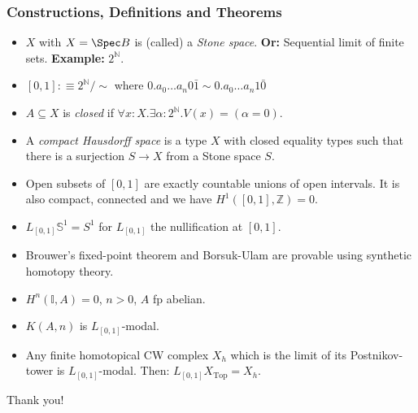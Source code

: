 \documentclass{beamer}
\begin{document}
\begin{frame}
  \frametitle{Constructions, Definitions and Theorems}
  \begin{itemize}
  \item $X$ with $X=\Spec B$ is (called) a \emph{Stone space}. \pause \textbf{Or:} Sequential limit of finite sets. \pause \textbf{Example:} $2^{\mathbb N}$.
    \pause
  \item $ [0,1] :\equiv 2^{\mathbb N}/\sim $ \pause \quad where $0.a_0\dots a_n0\bar{1}\sim 0.a_0\dots a_n1\bar{0}$
    \pause
  \item $A\subseteq X$ is \emph{closed} if $\forall x:X. \exists \alpha:2^{\mathbb N}. V(x)=(\alpha=0)$.
    \pause
  \item A \emph{compact Hausdorff space} is a type $X$ with closed equality types such that there is a surjection $S\to X$ from a Stone space $S$.
    \pause
  \item Open subsets of $[0,1]$ are exactly countable unions of open intervals. It is also compact, connected and we have $H^1([0,1],\mathbb Z)=0$.
    \pause
  \item $L_{[0,1]}\mathbb S^1=S^1$ for $L_{[0,1]}$ the nullification at $[0,1]$.
    \pause
  \item Brouwer's fixed-point theorem and Borsuk-Ulam are provable using synthetic homotopy theory.
    \pause
  \item $H^n(\mathbb I, A)=0$, $n>0$, $A$ fp abelian.
    \pause
  \item $K(A, n)$ is $L_{[0,1]}$-modal. 
  \item Any finite homotopical CW complex $X_{h}$ which is the limit of its Postnikov-tower is $L_{[0,1]}$-modal. \pause Then: $L_{[0,1]}X_{\mathrm{Top}}=X_h$.
  \end{itemize}
\end{frame}

\begin{frame}
  \begin{center}
    Thank you!
  \end{center}
\end{frame}
\end{document}
